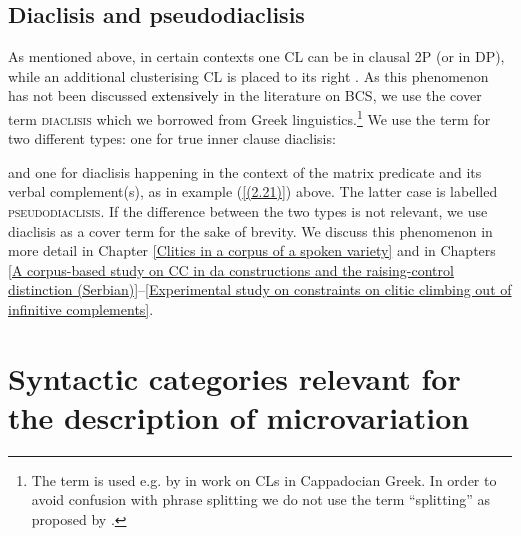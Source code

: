\subsection{Diaclisis and pseudodiaclisis}
\label{Diaclisis and pseudodiaclisis}
As mentioned above, in certain contexts one CL can be in clausal 2P (or in DP), while an additional clusterising CL is placed to its right \citep[cf.][196]{ZimmerlingKosta13}. As this phenomenon has not been discussed \textcolor{black}{extensively} in the literature on BCS, we use the cover term \textsc{diaclisis} which we borrowed from Greek linguistics.\footnote{The term is used e.g. by \citet[270]{Janse98} in work on CLs in Cappadocian Greek. In order to avoid confusion with phrase splitting we do not use the term ``splitting'' as proposed by \citet[196]{ZimmerlingKosta13}.} We use the term for two different types: one for true inner clause diaclisis:


\noindent and one for diaclisis happening in the context of the matrix predicate and its verbal complement(s), as in example (\ref{(2.21)}) above. The latter case is labelled \textsc{pseudodiaclisis}. If the difference between the two types is not relevant, we use diaclisis as a cover term for the sake of brevity. We discuss this phenomenon in more detail in Chapter \ref{Clitics in a corpus of a spoken variety} and in Chapters \ref{A corpus-based study on CC in da constructions and the raising-control distinction (Serbian)}--\ref{Experimental study on constraints on clitic climbing out of infinitive complements}.

\section{Syntactic categories relevant for the description of microvariation}
\label{Syntactic categories relevant for the description of microvariation}
